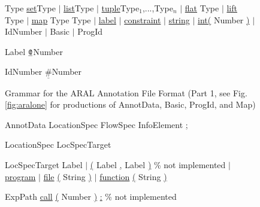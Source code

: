{\begin{figure}[!ht]
\begin{GRAMMAR}
{Type}           \>\>\>\>\>\garrow\> \underline{set}\lb Type \rb
                 \>\>\>\>\> \> $\mid$ \underline{list}\lb Type \rb
                 \>\>\>\>\> \> $\mid$ \underline{tuple}\lb Type$_1$,...,Type$_n$ \rb
                 \>\>\>\>\> \> $\mid$ \underline{flat} \lb Type \rb
                 \>\>\>\>\> \> $\mid$ \underline{lift} \lb Type \rb
                 \>\>\>\>\> \> $\mid$ \underline{map} \lb Type \comma Type \rb
                 \>\>\>\>\> \> $\mid$ \underline{label}
                 \>\>\>\>\> \> $\mid$ \underline{constraint}
                \>\>\>\>\> \> $\mid$ \underline{string}
                \>\>\>\>\> \> $\mid$ \underline{int(} Number \underline{)}
                 \>\>\>\>\> \> $\mid$ IdNumber
                 \>\>\>\>\> \> $\mid$ Basic
                 \>\>\>\>\> \> $\mid$ ProgId

{Label}           \>\>\>\>\>\garrow\> $\texttt{\underline{@}}$Number

{IdNumber}       \>\>\>\>\>\garrow\> $\underline{\texttt{\#}}$Number

\end{GRAMMAR}
\caption{Grammar for the ARAL Annotation File Format (Part 1, see Fig. \ref{fig:aralone} for productions of AnnotData, Basic, ProgId, and Map)}
\label{fig:annotationfileformat}
\end{figure}

\begin{figure}[!ht]
\begin{GRAMMAR}
{AnnotData}      \>\>\>\>\>\garrow\> LocationSpec FlowSpec InfoElement \underline{;}

{LocationSpec}   \>\>\>\>\>\garrow\> [ ExpPath ] LocSpecTarget

{LocSpecTarget}  \>\>\>\>\>\garrow\>Label
                 \>\>\>\>\> \>$\mid$ \underline{(} Label \underline{,} Label \underline{)} \hspace{2cm}\% not implemented 
                 \>\>\>\>\> \>$\mid$ \underline{program}
                 \>\>\>\>\> \>$\mid$ \underline{file} \underline{(}  String \underline{)} 
                 \>\>\>\>\> \>$\mid$ \underline{function} \underline{(}  String \underline{)} 

{ExpPath}        \>\>\>\>\>\garrow\> \underline{call} \underline{(} Number \underline{)} \underline{:}  \% not implemented


\end{GRAMMAR}
\end{figure}}
